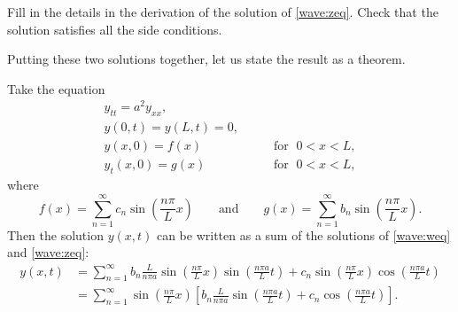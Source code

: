 \documentclass{ximera}
\begin{document}
\begin{exercise}
    Fill in the details in the derivation of the solution of \eqref{wave:zeq}. Check that the solution satisfies all the side conditions.
\end{exercise}

Putting these two solutions together, let us state the result as a theorem.
\begin{theorem}{}
    Take the equation
    \begin{equation} \label{wave:tyeq}
        \begin{array}{ll}
            y_{tt} = a^2 y_{xx} , &  \\
            y(0,t) = y(L,t) = 0 , &  \\
            y(x,0) = f(x) & \qquad \text{for } \; 0 < x < L , \\
            y_t(x,0) = g(x) & \qquad \text{for } \; 0 < x < L ,
        \end{array}
    \end{equation}
    where
    \begin{equation*}
        f(x) = \sum_{n=1}^\infty c_n \sin \left( \frac{n \pi}{L} x \right)
        \qquad \text{and} \qquad
        g(x) = \sum_{n=1}^\infty b_n \sin \left( \frac{n \pi}{L} x \right) .
    \end{equation*}
    Then the solution $y(x,t)$ can be written as a sum of the solutions of \eqref{wave:weq} and \eqref{wave:zeq}:
    \begin{equation*}
        \begin{aligned}
            y(x,t)
            & = \sum_{n=1}^\infty b_n \frac{L}{n \pi a} \sin \left( \frac{n \pi}{L} x \right) \sin \left( \frac{n \pi a}{L} t \right) 
            + c_n \sin \left( \frac{n \pi}{L} x \right) \cos \left( \frac{n \pi a}{L} t \right)  \\
            & = \sum_{n=1}^\infty \sin \left( \frac{n \pi}{L} x \right)
            \left[
                b_n \frac{L}{n \pi a} \sin \left( \frac{n \pi a}{L} t \right)  + c_n \cos \left( \frac{n \pi a}{L} t \right) 
            \right] .
        \end{aligned}
    \end{equation*}
\end{theorem}
\end{document}
